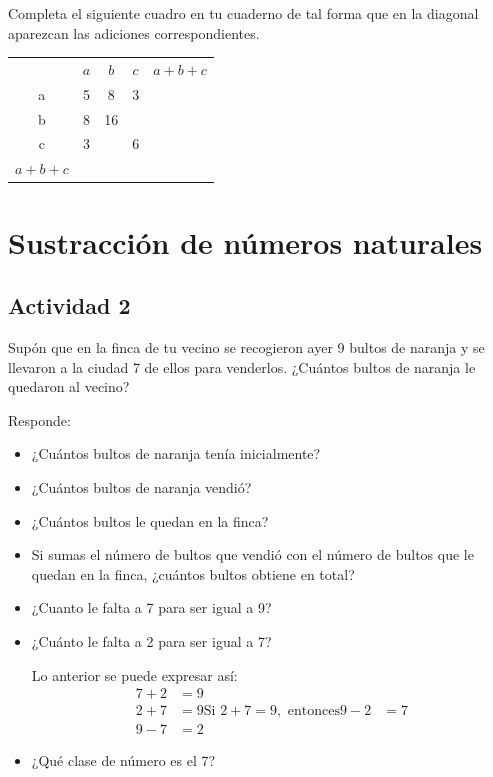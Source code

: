 \documentclass[10pt,twoside]{article}
\begin{document}
\begin{enumerate}
\begin{minipage}{.45\textwidth}
\item Completa el siguiente cuadro en tu cuaderno de tal forma que en la diagonal
aparezcan las adiciones correspondientes.
\end{minipage}\hfill
\begin{minipage}{.45\textwidth}
\begin{tabular}{ccccc}
 & $a$ & $b$ & $c$ & $a+b+c$ \\ 
\cline{2-5} 
a & \vline \hfill 5 \hfill \vline & 8 \hfill \vline & 3 \hfill \vline & \hfill \vline   \\ \cline{2-5}
b & \vline \hfill 8 \hfill \vline & 16 \hfill \vline & \hfill \vline & \\ \cline{2-4}
c & \vline \hfill 3 \hfill \vline & \hfill \vline & 6 \hfill \vline & \\ \cline{2-4}
$a+b+c$ &  \vline \hfill \hspace*{10pt} \hfill \vline & & \\ \cline{2-2}
\end{tabular} 
\end{minipage}
\end{enumerate}
\section*{Sustracci\'on de n\'umeros naturales}
\subsection*{Actividad 2}
Supón que en la finca de tu vecino se recogieron ayer 9 bultos de naranja y se
llevaron a la ciudad 7 de ellos para venderlos. ¿Cuántos bultos de naranja le
quedaron al vecino?

Responde:
\begin{itemize}
\item ¿Cuántos bultos de naranja tenía inicialmente?
\item ¿Cuántos bultos de naranja vendió?
\item ¿Cuántos bultos le quedan en la finca?
\item Si sumas el número de bultos que vendió con el número de bultos que le
    quedan en la finca, ¿cuántos bultos obtiene en total?
\item ¿Cuanto le falta a 7 para ser igual a 9?
\item ¿Cuánto le falta a 2 para ser igual a 7?

Lo anterior se puede expresar así: 
\begin{align*}
7 + 2 &= 9\\
2+7&=9
\mbox{Si } 2+7=9, \mbox{ entonces} 9-2&=7\\
9-7&=2 
\end{align*}
\item ¿Qué clase de número es el 7?
\end{itemize}
\end{document}

